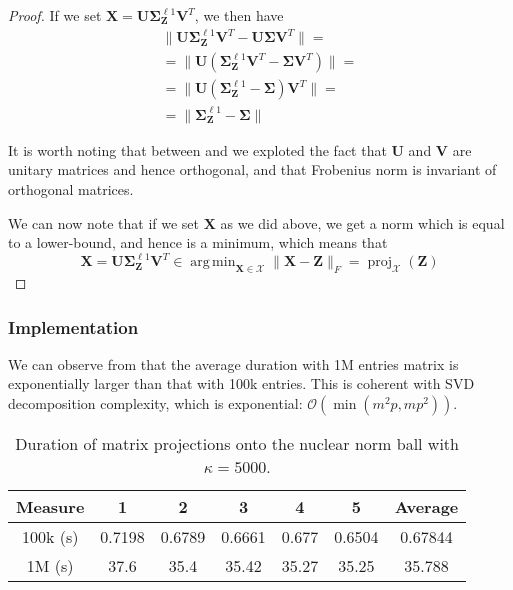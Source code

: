 \documentclass[12pt]{article}
\DeclareMathOperator*{\argmin}{arg\,min}
\DeclareMathOperator*{\proj}{proj}
\newcommand{\boldZ}{\mathbf{Z}}
\newcommand{\boldX}{\mathbf{X}}
\newcommand{\boldU}{\mathbf{U}}
\newcommand{\boldV}{\mathbf{V}}
\newcommand{\setX}{\mathcal{X}}
\newcommand{\boldS}{\mathbf{\Sigma}}
\begin{document}
\begin{proof}
If we set $\boldX = \boldU \boldS_{\boldZ}^{\ell1} \boldV^T$, we then have
\begin{gather}
    \lVert \boldU \boldS_{\boldZ}^{\ell1} \boldV^T - \boldU \boldS \boldV^T \rVert = \\
    = \lVert \boldU (\boldS_{\boldZ}^{\ell1} \boldV^T - \boldS \boldV^T) \rVert = \\
    = \lVert \boldU (\boldS_{\boldZ}^{\ell1} - \boldS) \boldV^T \rVert = \label{eq:frob-invariance-1} \\
    = \lVert \boldS_{\boldZ}^{\ell1} - \boldS \rVert \label{eq:frob-invariance-2}
\end{gather}

It is worth noting that between  and  we exploted the fact that $\boldU$ and $\boldV$ are unitary matrices and hence orthogonal, and that Frobenius norm is invariant of orthogonal matrices.

We can now note that if we set $\boldX$ as we did above, we get a norm which is equal to a lower-bound, and hence is a minimum, which means that
\begin{equation}
    \boldX = \boldU \boldS_{\boldZ}^{\ell1} \boldV^T \in \argmin_{\boldX \in \setX} \lVert \boldX - \boldZ \rVert_{F} = \proj_{\setX}(\boldZ)
\end{equation}
\end{proof}

\subsubsection{Implementation}
We can observe from  that the average duration with 1M entries matrix is exponentially larger than that with 100k entries. This is coherent with SVD decomposition complexity, which is exponential: $\mathcal{O}(\min(m^2p, mp^2))$.

\begin{table}[ht]
\centering
\caption{Duration of matrix projections onto the nuclear norm ball with $\kappa = 5000$.}
\label{tab:projections}
\begin{tabular}{ccccccc}
Measure & 1 & 2 & 3 & 4 & 5 & Average \\ \hline
100k (s) & 0.7198 & 0.6789 & 0.6661 & 0.677 & 0.6504 & 0.67844 \\ \hline
1M (s) & 37.6 & 35.4 & 35.42 & 35.27 & 35.25 & 35.788
\end{tabular}
\end{table}
\end{document}
